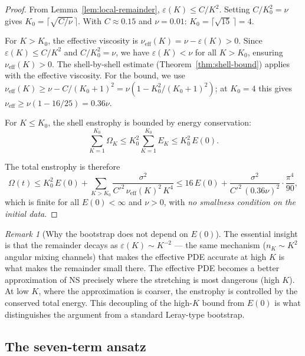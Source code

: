 \documentclass[11pt,a4paper]{article}
\theoremstyle{remark}
\newtheorem{remark}[theorem]{Remark}
\begin{document}
\begin{proof}
From Lemma~\ref{lem:local-remainder}, $\varepsilon(K) \leq C/K^2$.  Setting $C/K_0^2 = \nu$ gives $K_0 = \lceil\sqrt{C/\nu}\,\rceil$.  With $C \approx 0.15$ and $\nu = 0.01$: $K_0 = \lceil\sqrt{15}\,\rceil = 4$.

For $K > K_0$, the effective viscosity is $\nu_{\mathrm{eff}}(K) = \nu - \varepsilon(K) > 0$.  Since $\varepsilon(K) \leq C/K^2$ and $C/K_0^2 = \nu$, we have $\varepsilon(K) < \nu$ for all $K > K_0$, ensuring $\nu_{\mathrm{eff}}(K) > 0$.  The shell-by-shell estimate (Theorem~\ref{thm:shell-bound}) applies with the effective viscosity.  For the bound, we use $\nu_{\mathrm{eff}}(K) \geq \nu - C/(K_0+1)^2 = \nu(1 - K_0^2/(K_0+1)^2)$; at $K_0 = 4$ this gives $\nu_{\mathrm{eff}} \geq \nu(1 - 16/25) = 0.36\nu$.

For $K \leq K_0$, the shell enstrophy is bounded by energy conservation:
\[
  \sum_{K=1}^{K_0} \Omega_K \leq K_0^2 \sum_{K=1}^{K_0} E_K \leq K_0^2\, E(0).
\]

The total enstrophy is therefore
\[
  \Omega(t) \leq K_0^2\, E(0) + \sum_{K > K_0} \frac{\sigma^2}{C'^2\, \nu_{\mathrm{eff}}(K)^2\, K^4} \leq 16\, E(0) + \frac{\sigma^2}{C'^2\, (0.36\nu)^2} \cdot \frac{\pi^4}{90},
\]
which is finite for all $E(0) < \infty$ and $\nu > 0$, with \emph{no smallness condition on the initial data}.
\end{proof}

\begin{remark}[Why the bootstrap does not depend on $E(0)$]
The essential insight is that the remainder decays as $\varepsilon(K) \sim K^{-2}$ — the same mechanism ($n_K \sim K^2$ angular mixing channels) that makes the effective PDE accurate at high $K$ is what makes the remainder small there.  The effective PDE becomes a better approximation of NS precisely where the stretching is most dangerous (high $K$).  At low $K$, where the approximation is coarser, the enstrophy is controlled by the conserved total energy.  This decoupling of the high-$K$ bound from $E(0)$ is what distinguishes the argument from a standard Leray-type bootstrap.
\end{remark}

\subsection{The seven-term ansatz}
\end{document}
